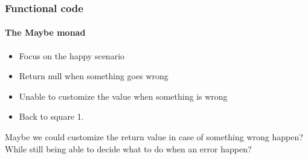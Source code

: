 \begin{frame}
    
\end{frame}

\begin{frame}
    
\end{frame}

\begin{frame}
    
\end{frame}

\begin{frame}
    
\end{frame}

\begin{frame}
    
\end{frame}

\begin{frame}
    
\end{frame}


\begin{frame}
    \frametitle{Functional code}
    \framesubtitle{The Maybe monad}

    \begin{itemize}[<+->]
        \item Focus on the happy scenario
        \item Return null when something goes wrong
        \item Unable to customize the value when something is wrong
        \item Back to square 1.
    \end{itemize}
\end{frame}

\begin{frame}
    Maybe we could customize the return value in case of something wrong happen?\\
    \vspace{1em}
    \pause
    While still being able to decide what to do when an error happen?
\end{frame}

\begin{frame}
    
\end{frame}
